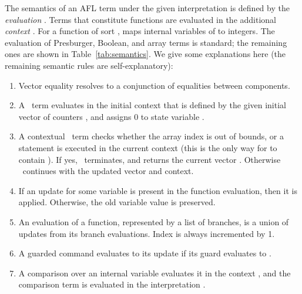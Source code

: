 The semantics of an AFL term  under the given interpretation  is defined by the \emph{evaluation} . 
Terms that constitute functions are evaluated in the additional \emph{context} . For a function  of sort ,  maps internal variables of  to integers. 
The evaluation of Presburger, Boolean, and array terms is standard; the remaining ones are shown in Table~\ref{tab:semantics}. We give some explanations here (the remaining semantic rules are self-explanatory):
\begin{enumerate}
\item Vector equality resolves to a conjunction of equalities between components.
\item A \Fold\ term evaluates in the initial context that is defined by the given initial vector of counters , and assigns 0 to state variable .
\item A contextual \Fold\ term checks whether the array index is out of bounds, or a  statement is executed in the current context (this is the only way for  to contain ). If yes, \Fold\ terminates, and returns the current vector . Otherwise \Fold\ continues with the updated vector and context.
\item If an update  for some variable  is present in the function evaluation, then it is applied. Otherwise, the old variable value is preserved.
\item An evaluation of a function, represented by a list of branches, is a union of updates from its branch evaluations. Index  is always incremented by 1.
\item A guarded command evaluates to its update if its guard evaluates to .
\item A comparison over an internal variable evaluates it in the context , and the comparison term is evaluated in the interpretation .
\end{enumerate}






















